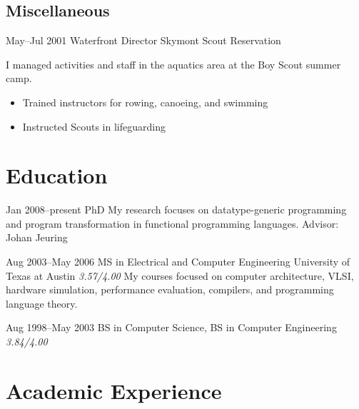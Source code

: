 \documentclass[11pt,a4paper,roman]{moderncv}
\begin{document}

\subsection{Miscellaneous}

\cventry%
{May--Jul 2001}%
{Waterfront Director}%
{Skymont Scout Reservation}%
{\altamont}%
{}%
{I managed activities and staff in the aquatics area at the Boy Scout summer camp.
\begin{itemize}
\item Trained instructors for rowing, canoeing, and swimming
\item Instructed Scouts in lifeguarding
\end{itemize}}


\section{Education}

\cventry%
{Jan 2008--present}%
{PhD}%
{\uu}%
{\utrecht}%
{}%
{My research focuses on datatype-generic programming and program transformation
in functional programming languages.\newline{}%
Advisor: Johan Jeuring}

\cventry%
{Aug 2003--May 2006}%
{MS in Electrical and Computer Engineering}%
{University of Texas at Austin}%
{\austin}%
{\textit{3.57/4.00}}%
{My courses focused on computer architecture, VLSI, hardware simulation,
performance evaluation, compilers, and programming language theory.}

\cventry%
{Aug 1998--May 2003}%
{BS in Computer Science, BS in Computer Engineering}%
{\wustl}%
{\stlouis}%
{\textit{3.84/4.00}}%
{}


\section{Academic Experience}

\newcommand\coursenote{\scriptsize [U]ndergraduate and [G]raduate courses (with year)}

\end{document}
